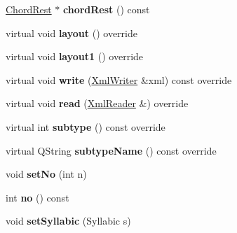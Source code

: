 \begin{DoxyCompactItemize}
\item 
\mbox{\label{class_ms_1_1_lyrics_aac54a820588b07d0d5fdee385507e7d6}} 
\hyperlink{class_ms_1_1_chord_rest}{Chord\+Rest} $\ast$ {\bfseries chord\+Rest} () const
\item 
\mbox{\label{class_ms_1_1_lyrics_a87732bfcc0120f725df933b881e110ad}} 
virtual void {\bfseries layout} () override
\item 
\mbox{\label{class_ms_1_1_lyrics_a4fabf368880eb62cee9f517fbb5b0853}} 
virtual void {\bfseries layout1} () override
\item 
\mbox{\label{class_ms_1_1_lyrics_adcf196a85f61983bad6e2ed1b69bf394}} 
virtual void {\bfseries write} (\hyperlink{class_ms_1_1_xml_writer}{Xml\+Writer} \&xml) const override
\item 
\mbox{\label{class_ms_1_1_lyrics_a64fdfe7b2aeed6d00bc147d37543f6e9}} 
virtual void {\bfseries read} (\hyperlink{class_ms_1_1_xml_reader}{Xml\+Reader} \&) override
\item 
\mbox{\label{class_ms_1_1_lyrics_ac7ed6394c55e7d1024cfb572a10b35c3}} 
virtual int {\bfseries subtype} () const override
\item 
\mbox{\label{class_ms_1_1_lyrics_a7ea17d3d63309e969de14a4dd0220100}} 
virtual Q\+String {\bfseries subtype\+Name} () const override
\item 
\mbox{\label{class_ms_1_1_lyrics_a53d99c9aff15e25d812d178e85ff8a58}} 
void {\bfseries set\+No} (int n)
\item 
\mbox{\label{class_ms_1_1_lyrics_a8dc2cd4b5b3afad6a572afeb9d238399}} 
int {\bfseries no} () const
\item 
\mbox{\label{class_ms_1_1_lyrics_aca68e350ff1365a5bf8526ad946053fc}} 
void {\bfseries set\+Syllabic} (Syllabic s)
\item 
\mbox{\label{class_ms_1_1_lyrics_a4830621793c7d9a612856aefd401bbe0}} 

\end{DoxyCompactItemize}
